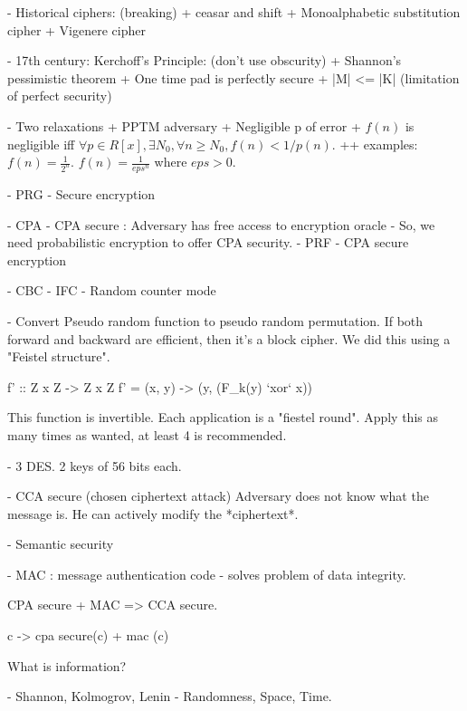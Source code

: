 - Historical ciphers:  (breaking)
+ ceasar and shift
+ Monoalphabetic substitution cipher
+  Vigenere cipher

- 17th century: Kerchoff's Principle: (don't use obscurity)
+ Shannon's pessimistic theorem 
+ One time pad is perfectly secure
+ |M| <= |K| (limitation of perfect security)


- Two relaxations
+ PPTM adversary
+ Negligible p of error
+ $f(n)$ is negligible iff $\forall p \in R[x], \exists N_0, \forall n \geq N_0, f(n) < 1 / p(n)$.
++ examples: $f(n) = \frac{1}{2^n}$. $f(n) = \frac{1}{eps^n}$ where $eps > 0$.


- PRG
- Secure encryption

- CPA
- CPA secure : Adversary has free access to encryption oracle
- So, we need probabilistic encryption to offer CPA security.
- PRF
- CPA secure encryption

- CBC
- IFC
- Random counter mode

- Convert Pseudo random function to pseudo random permutation. If both
  forward and backward are efficient, then it's a block cipher. We did this
  using a "Feistel structure".

f' :: Z x Z -> Z x Z
f' = (x, y) -> (y, (F_k(y) `xor` x))

This function is invertible.
Each application is a "fiestel round".
Apply this as many times as wanted, at least 4 is recommended.


- 3 DES. 2 keys of 56 bits each.


- CCA secure (chosen ciphertext attack)
  Adversary does not know what the message is. He can actively modify the 
  *ciphertext*.

- Semantic security


- MAC : message authentication code - solves problem of data integrity.

CPA secure + MAC => CCA secure.

c -> cpa secure(c) + mac (c)


What is information?

- Shannon,  Kolmogrov, Lenin
- Randomness, Space, Time.
